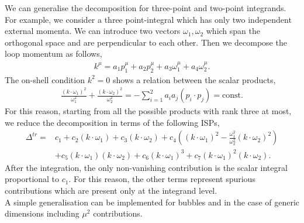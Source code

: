 We can generalise the decomposition for three-point and two-point integrands. For example, we consider a three point-integral which has only two independent external momenta. We can introduce two vectors $\omega_1, \omega_2$ which span the orthogonal space and are perpendicular to each other. Then we decompose the loop momentum as follows,
\begin{align*}
	k^\mu= a_1 p_1^\mu + a_2 p_2^\mu+ a_3 \omega_1^\mu + a_4 \omega_2^\mu.
\end{align*}
The on-shell condition $k^2=0$ shows a relation between the scalar products, 
\begin{align*}
	\frac{(k\cdot \omega_1)^2}{\omega_1^2}+\frac{(k\cdot \omega_2)^2}{\omega_2^2}=-\sum_{i=1}^2 a_ia_j (p_i\cdot p_j)=\text{const}.
\end{align*}
For this reason, starting from all the possible products with rank three at most, we reduce the decomposition in terms of the following ISPs,
\begin{align*}
	\Delta^{tr}=&c_1+c_2(k\cdot \omega_1)+c_3 (k\cdot \omega_2) + c_4 \left((k\cdot \omega_1)^2-\frac{\omega_1^2}{\omega_2^2}(k\cdot \omega_2)^2\right)\\
	&+c_5 (k\cdot \omega_1)(k\cdot \omega_2)+c_6 (k\cdot \omega_1)^3+c_7 (k\cdot \omega_1)^2(k\cdot \omega_2).
\end{align*}
After the integration, the only non-vanishing contribution is the scalar integral proportional to $c_1$. For this reason, the other terms represent spurious contributions which are present only at the integrand level.\\

A simple generalisation can be implemented for bubbles and in the case of generic dimensions including $\mu^2$ contributions.